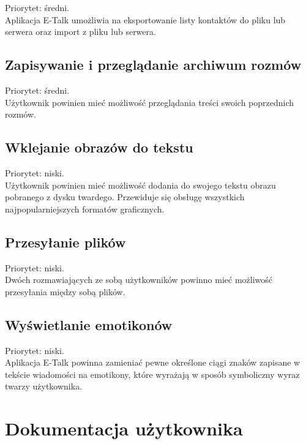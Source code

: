 \documentclass[a4paper,12pt]{article}
\begin{document}
Priorytet: średni.\\

Aplikacja E-Talk umożliwia na eksportowanie listy kontaktów do pliku lub serwera oraz import z pliku lub serwera.
\subsection[Zapisywanie i przeglądanie archiwum rozmów]{Zapisywanie i przeglądanie archiwum rozmów}
Priorytet: średni.\\

Użytkownik powinien mieć możliwość przeglądania treści swoich poprzednich rozmów.

\subsection[Wklejanie obrazów do tekstu]{Wklejanie obrazów do tekstu}

Priorytet: niski.\\

Użytkownik powinien mieć możliwość dodania do swojego tekstu obrazu pobranego z dysku twardego.
Przewiduje się obsługę wszystkich najpopularniejszych formatów graficznych.
\subsection[Przesyłanie plików]{Przesyłanie plików}

Priorytet: niski.\\

Dwóch rozmawiających ze sobą użytkowników powinno mieć możliwość przesyłania między sobą plików.
\subsection[Wyświetlanie emotikonów]{Wyświetlanie emotikonów}

Priorytet: niski.\\

Aplikacja E-Talk powinna zamieniać pewne określone ciągi znaków zapisane w tekście wiadomości na emotikony, które
wyrażają w sposób symboliczny wyraz twarzy użytkownika.

\section[Dokumentacja użytkownika]{Dokumentacja użytkownika}
\end{document}
